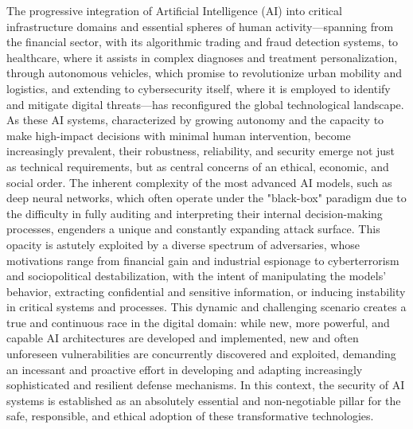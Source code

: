 \documentclass[twoside,brazilian,english]{UNISINOSmonografia}
\begin{document}
The progressive integration of Artificial Intelligence (AI) into critical infrastructure domains and essential spheres of human activity—spanning from the financial sector, with its algorithmic trading and fraud detection systems, to healthcare, where it assists in complex diagnoses and treatment personalization, through autonomous vehicles, which promise to revolutionize urban mobility and logistics, and extending to cybersecurity itself, where it is employed to identify and mitigate digital threats—has reconfigured the global technological landscape. As these AI systems, characterized by growing autonomy and the capacity to make high-impact decisions with minimal human intervention, become increasingly prevalent, their robustness, reliability, and security emerge not just as technical requirements, but as central concerns of an ethical, economic, and social order. The inherent complexity of the most advanced AI models, such as deep neural networks, which often operate under the "black-box" paradigm due to the difficulty in fully auditing and interpreting their internal decision-making processes, engenders a unique and constantly expanding attack surface. This opacity is astutely exploited by a diverse spectrum of adversaries, whose motivations range from financial gain and industrial espionage to cyberterrorism and sociopolitical destabilization, with the intent of manipulating the models' behavior, extracting confidential and sensitive information, or inducing instability in critical systems and processes. This dynamic and challenging scenario creates a true and continuous race in the digital domain: while new, more powerful, and capable AI architectures are developed and implemented, new and often unforeseen vulnerabilities are concurrently discovered and exploited, demanding an incessant and proactive effort in developing and adapting increasingly sophisticated and resilient defense mechanisms. In this context, the security of AI systems is established as an absolutely essential and non-negotiable pillar for the safe, responsible, and ethical adoption of these transformative technologies.
\end{document}
